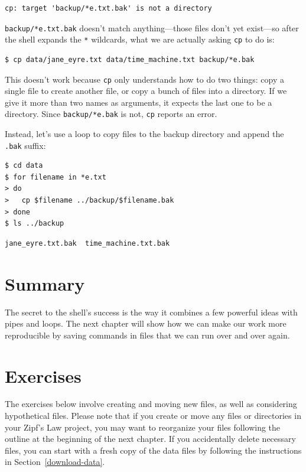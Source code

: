 \documentclass[
]{krantz}
\begin{document}
\begin{verbatim}
cp: target 'backup/*e.txt.bak' is not a directory
\end{verbatim}

\texttt{backup/*e.txt.bak} doesn't match anything---those files don't yet exist---so
after the shell expands the \texttt{*} wildcards,
what we are actually asking \texttt{cp} to do is:

\begin{verbatim}
$ cp data/jane_eyre.txt data/time_machine.txt backup/*e.bak
\end{verbatim}

This doesn't work because \texttt{cp} only understands how to do two things:
copy a single file to create another file,
or copy a bunch of files into a directory.
If we give it more than two names as arguments,
it expects the last one to be a directory.
Since \texttt{backup/*e.bak} is not,
\texttt{cp} reports an error.

Instead,
let's use a loop to copy files to the backup directory
and append the \texttt{.bak} suffix:

\begin{verbatim}
$ cd data
$ for filename in *e.txt
> do
>   cp $filename ../backup/$filename.bak
> done
$ ls ../backup
\end{verbatim}

\begin{verbatim}
jane_eyre.txt.bak  time_machine.txt.bak
\end{verbatim}

\hypertarget{bash-tools-summary}{%
\section{Summary}\label{bash-tools-summary}}

The secret to the shell's success is the way it combines a few powerful ideas with pipes and loops.
The next chapter will show how we can make our work more reproducible
by saving commands in files that we can run over and over again.

\hypertarget{bash-tools-exercises}{%
\section{Exercises}\label{bash-tools-exercises}}

The exercises below involve creating and moving new files,
as well as considering hypothetical files.
Please note that if you create or move any files or directories in your Zipf's Law project,
you may want to reorganize your files following the outline at the beginning of the next chapter.
If you accidentally delete necessary files,
you can start with a fresh copy of the data files
by following the instructions in Section~\ref{download-data}.
\end{document}
